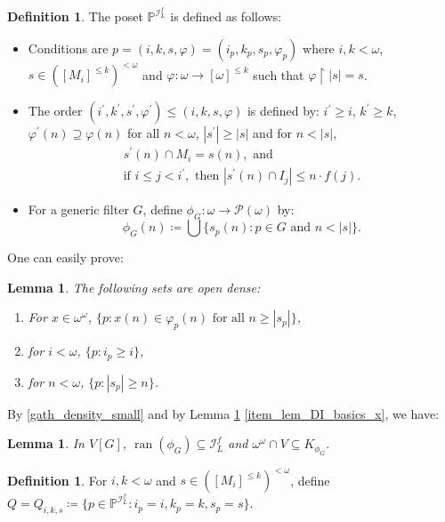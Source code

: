\documentclass[a4paper,12pt]{amsart}
\newtheorem{lem}[thm]{Lemma}
\theoremstyle{definition}
\newtheorem{dfn}[thm]{Definition}
\numberwithin{thm}{section}
\numberwithin{equation}{section}
\newcommand{\oo}{{\omega}^\omega}
\newcommand{\on}{\mathpunct{\upharpoonright}}
\DeclareMathOperator{\ran}{ran}
\newcommand{\I}{\mathscr{I}}
\newcommand{\dif}{\mathbb{P}^{\I_L^f}}
\newcommand{\IL}{\I_{L}}
\begin{document}
    \begin{dfn} 
        The poset $\dif$ is defined as follows:
        \begin{itemize}
		    \item Conditions are $p=(i,k,s,\varphi)=(i_p,k_p,s_p,\varphi_p)$ where $i,k<\omega$, $s\in([M_i]^{\leq k})^{<\omega}$ and $\varphi\colon \omega\to [\omega]^{\leq k}$ such that $\varphi\on |s|=s$.
		    \item The order $(i^\prime,k^\prime,s^\prime,\varphi^\prime)\leq(i,k,s,\varphi)$ is defined by: $i^\prime\geq i$, $k^\prime\geq k$, $\varphi^\prime(n)\supseteq\varphi(n)$ for all $n<\omega$, $|s^\prime|\geq|s|$ and for $n<|s|$,
		      \begin{gather}
			    \label{gath_end_ext} s^\prime(n)\cap M_i=s(n),\text{ and}\\ 
			    \label{gath_density_small} \text{if }i\leq j< i^\prime,\text{ then } |s^\prime(n)\cap I_j|\leq n \cdot f(j).
		    \end{gather}
	        \item For a generic filter $G$, define $\phi_G\colon\omega\to\mathcal{P}(\omega)$ by:
            \[\phi_G(n)\coloneq\bigcup \{s_p(n):p\in G\text{ and }n<|s|\}.\]
	   \end{itemize}
    \end{dfn}

    One can easily prove:
    \begin{lem}
    	\label{lem:DI_basics}
    	The following sets are open dense:
    	\begin{enumerate}
    		\item\label{item_lem_DI_basics_x} For $x\in\oo$, $\{p:x(n)\in\varphi_p(n)\text{ for all }n\geq |s_p|\}$, 
    		\item for $i<\omega$, $\{p:i_p\geq i\}$, 
    		\item\label{item_lem_DI_basics_s} for $n<\omega$, $\{p:|s_p|\geq n\}$.
    	\end{enumerate}
    \end{lem}

    By \eqref{gath_density_small} and by Lemma \ref{lem:DI_basics} \eqref{item_lem_DI_basics_x}, we have:
    
    \begin{lem}\label{lem:posetILf_basics}
    	In $V[G]$,  $\ran(\phi_G)\subseteq\IL^f$ and $\oo\cap V\subseteq K_{\phi_G}$.
    \end{lem}

    \begin{dfn}\label{dfn:Q_iks}
    	For $i,k<\omega$ and $s\in([M_i]^{\leq k})^{<\omega}$,
    	define $Q=Q_{i,k,s}\coloneq\{p\in\dif:i_p=i, k_p=k, s_p=s\}$.
    \end{dfn}
    
\end{document}
